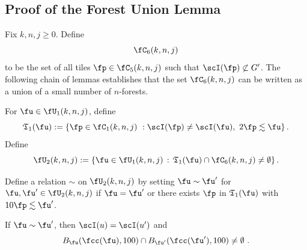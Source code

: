 \subsection{Proof of the Forest Union Lemma}
\label{subsecforest}

Fix $k,n,j\ge 0$.
Define
$$
    \fC_6(k,n,j)
$$
to be the set of all tiles $\fp \in \fC_5(k,n,j)$ such that $\scI(\fp) \not\subset G'$. The following chain of lemmas
establishes that the set $\fC_6(k,n,j)$ can be written as a union of a small number of $n$-forests.

For $\fu\in \fU_1(k,n,j)$, define
\begin{equation}
    \label{eq-T1-def}
    \mathfrak{T}_1(\fu):= \{\fp \in \fC_1(k,n,j) \ : \scI(\fp)\neq \scI(\fu), \ 2\fp \lesssim \fu\}\,.
\end{equation}
Define
\begin{equation}
    \label{eq-U2-def}
    \fU_2(k,n,j) := \{ \fu \in \fU_1(k,n,j) \, : \, \mathfrak{T}_1(\fu) \cap \fC_6(k,n,j) \ne \emptyset\}\,.
\end{equation}

Define a relation $\sim$ on $\fU_2(k,n,j)$
by setting $\fu\sim \fu'$
for $\fu,\fu'\in \fU_2(k,n,j)$
if $\fu=\fu'$ or there exists $\fp$ in $\mathfrak{T}_1(\fu)$
with $10 \fp\lesssim \fu'$.

\begin{lemma}
    \label{relation-geometry}
    \leanok
    If $\fu \sim \fu'$, then $\scI(u) = \scI(u')$ and
    \begin{equation*}
        B_{\fu}(\fcc(\fu), 100) \cap B_{\fu'}(\fcc(\fu'), 100) \neq \emptyset\ .
    \end{equation*}
\end{lemma}

